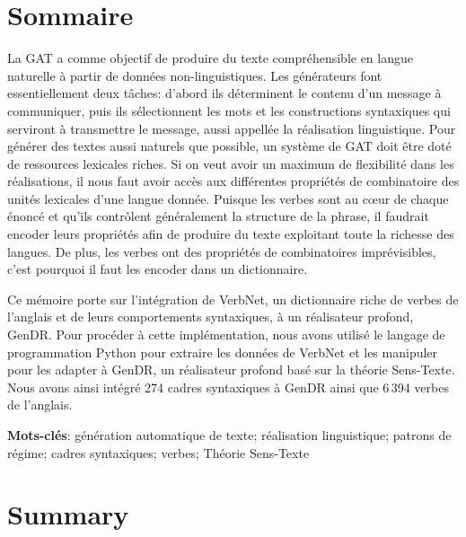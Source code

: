 \chapter*{Sommaire} 	%
La \ac{GAT} a comme objectif de produire du texte compréhensible en langue naturelle à partir de données non-linguistiques. Les générateurs font essentiellement deux tâches: d'abord ils déterminent le contenu d'un message à communiquer, puis ils sélectionnent les mots et les constructions syntaxiques qui serviront à transmettre le message, aussi appellée la réalisation linguistique. Pour générer des textes aussi naturels que possible, un système de \ac{GAT} doit être doté de ressources lexicales riches. Si on veut avoir un maximum de flexibilité dans les réalisations, il nous faut avoir accès aux différentes propriétés de combinatoire des unités lexicales d'une langue donnée. Puisque les verbes sont au c\oe{}ur de chaque énoncé et qu'ils contrôlent généralement la structure de la phrase, il faudrait encoder leurs propriétés afin de produire du texte exploitant toute la richesse des langues. De plus, les verbes ont des propriétés de combinatoires imprévisibles, c'est pourquoi il faut les encoder dans un dictionnaire.

Ce mémoire porte sur l'intégration de VerbNet, un dictionnaire riche de verbes de l'anglais et de leurs comportements syntaxiques, à un réalisateur profond, GenDR. Pour procéder à cette implémentation, nous avons utilisé le langage de programmation Python pour extraire les données de VerbNet et les manipuler pour les adapter à GenDR, un réalisateur profond basé sur la théorie Sens-Texte. Nous avons ainsi intégré 274 cadres syntaxiques à GenDR ainsi que 6\,394 verbes de l'anglais.

\textbf{Mots-clés}: génération automatique de texte; réalisation linguistique; patrons de régime; cadres syntaxiques; verbes; Théorie Sens-Texte

\chapter*{Summary}

